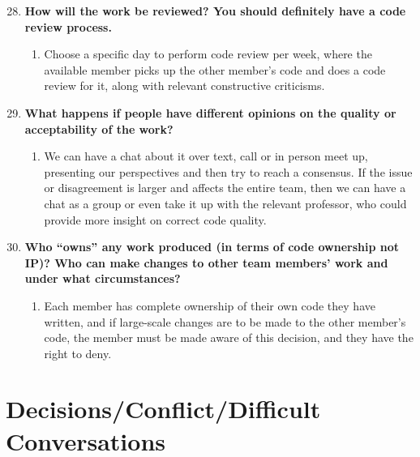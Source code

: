 \documentclass[12pt]{article}
\begin{document}
\begin{enumerate}
    \setcounter{enumi}{27}
    \item \textbf{How will the work be reviewed? You should definitely have a code review process.}
    \begin{enumerate}
        \item Choose a specific day to perform code review per week, where the available member picks up the other member's code and does a code review for it, along with relevant constructive criticisms.
    \end{enumerate}

    \item \textbf{What happens if people have different opinions on the quality or acceptability of the work?}
    \begin{enumerate}
        \item We can have a chat about it over text, call or in person meet up, presenting our perspectives and then try to reach a consensus. If the issue or disagreement is larger and affects the entire team, then we can have a chat as a group or even take it up with the relevant professor, who could provide more insight on correct code quality.
    \end{enumerate}

    \item \textbf{Who ``owns'' any work produced (in terms of code ownership not IP)? Who can make changes to other team members' work and under what circumstances?}
    \begin{enumerate}
        \item Each member has complete ownership of their own code they have written, and if large-scale changes are to be made to the other member's code, the member must be made aware of this decision, and they have the right to deny.
    \end{enumerate}
\end{enumerate}

\section{Decisions/Conflict/Difficult Conversations}
\end{document}
